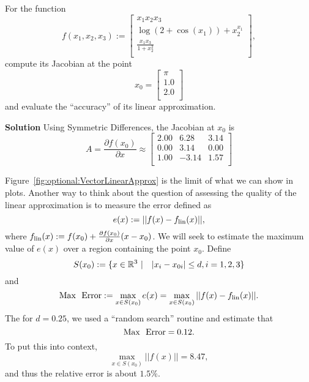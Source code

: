  \begin{example}
 \label{ex:optional:JacobianBasedApproximation}
 For the function 
 \begin{equation}
 f(x_1,x_2,x_3):= 
 \left[
\begin{array}{c}
x_1 x_2 x_3  \\
\log(2+\cos(x_1)) + x_2^{x_1} \\
 \frac{x_1 x_3}{1+ x_2^2} \\
\end{array}
\right],
 \end{equation}
 compute its Jacobian at the point 
 $$x_0 = \left[
\begin{array}{c}
\pi \\
1.0 \\
2.0 \\
\end{array}
\right]$$
and evaluate the ``accuracy'' of its linear approximation.
  \end{example}
 
 \textbf{Solution}
 Using Symmetric Differences, the Jacobian at $x_0$ is 
 \begin{equation}
 A=\frac{\partial f(x_0)}{\partial x}\approx
\left[
\begin{array}{rrr}
2.00 & 6.28 & 3.14 \\
0.00 & 3.14 & 0.00 \\
1.00 & -3.14 & 1.57 \\
\end{array}
\right]
\end{equation}
 
 Figure~\ref{fig:optional:VectorLinearApprox} is the limit of what we can show in plots. Another way to think about the question of assessing the quality of the linear approximation is to measure the error defined as
 $$e(x):= ||f(x)-f_{\rm lin}(x) ||,$$
 where $f_{\rm lin}(x):=f(x_0) + \frac{\partial f(x_0)}{\partial x} (x - x_0)$. We will seek to estimate the maximum value of $e(x)$ over a region containing the point $x_0$.
 Define 
 $$S(x_0):= \{x  \in \mathbb R^3 ~|~~~ |x_i-x_{0i} | \le d, i=1,2,3 \} $$
 and 
\begin{equation}
    \label{eq:optional:MaxErrorLinApprox}
    {\rm Max~~ Error} := \max_{x\in S(x_0)} e(x) = \max_{x\in S(x_0)} ||f(x)-f_{\rm lin}(x) ||.
\end{equation}
The for $d=0.25$, we used a ``random search'' routine and estimate that
$$ {\rm Max~~ Error}=0.12.$$
To put this into context, 
$$  \max_{x\in S(x_0)} ||f(x)|| = 8.47,$$
and thus the relative error is about $1.5\%.$
\Qed

